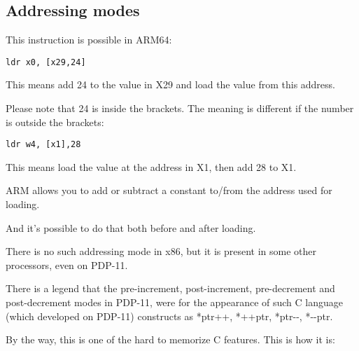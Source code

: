 ﻿\subsection{Addressing modes}
\label{ARM_postindex_vs_preindex}
\myindex{\CLanguageElements!\PostIncrement}
\myindex{\CLanguageElements!\PostDecrement}
\myindex{\CLanguageElements!\PreIncrement}
\myindex{\CLanguageElements!\PreDecrement}

This instruction is possible in ARM64:

\begin{lstlisting}[style=customasmARM]
ldr	x0, [x29,24]
\end{lstlisting}

This means add 24 to the value in X29 and load the value from this address.

Please note that 24 is inside the brackets.
The meaning is different if the number is outside the brackets:

\begin{lstlisting}[style=customasmARM]
ldr	w4, [x1],28
\end{lstlisting}

This means load the value at the address in X1, then add 28 to X1.


ARM allows you to add or subtract a constant to/from the address used for loading.

And it's possible to do that both before and after loading.

There is no such addressing mode in x86, but it is present in some other processors, even on PDP-11.

There is a legend that the pre-increment, post-increment, pre-decrement and post-decrement modes in PDP-11,
were  for the appearance of such C language (which developed on PDP-11) constructs as
*ptr++, *++ptr, *ptr-{}-, *-{}-ptr. 

By the way, this is one of the hard to memorize C features.
This is how it is:

